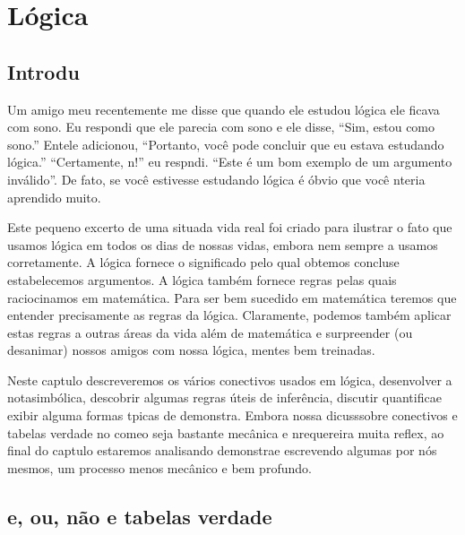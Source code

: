\chapter{L\'ogica}
\section{Introdu\cao}\label{introducao}

Um amigo meu recentemente me disse que quando ele estudou l\'ogica ele ficava com sono. Eu respondi que ele parecia com sono e ele disse, ``Sim, estou como sono.'' Ent\ao ele adicionou, ``Portanto, voc\^e pode concluir que eu estava estudando l\'ogica.'' ``Certamente, n\aoi!'' eu respndi. ``Este \'e um bom exemplo de um argumento inv\'alido''. De fato, se voc\^e estivesse estudando l\'ogica \'e \'obvio que voc\^e n\ao teria aprendido muito.

Este pequeno excerto de uma situa\cao da vida real  foi criado para ilustrar o fato que usamos l\'ogica em todos os dias de nossas vidas, embora nem sempre a usamos corretamente. A l\'ogica fornece o significado pelo qual obtemos conclus\oes e estabelecemos argumentos. A l\'ogica tamb\'em fornece regras pelas quais raciocinamos em matem\'atica. Para ser bem sucedido em matem\'atica teremos que entender precisamente as regras da l\'ogica. Claramente, podemos tamb\'em aplicar estas regras a outras \'areas da vida al\'em de matem\'atica e surpreender (ou desanimar) nossos amigos com nossa l\'ogica, mentes bem treinadas.

Neste cap\ih tulo descreveremos os v\'arios conectivos usados em l\'ogica, desenvolver a nota\cao simb\'olica, descobrir algumas regras \'uteis de infer\^encia, discutir quantifica\cao e exibir alguma formas t\ih picas de demonstra\caoi. Embora nossa dicuss\ao sobre conectivos e tabelas verdade no come\cc o seja bastante mec\^anica e n\ao requereira muita reflex\aoi, ao final do cap\ih tulo estaremos analisando demonstra\coes e escrevendo algumas por n\'os mesmos, um processo menos mec\^anico e bem profundo.

\section{e, ou, n\~ao e tabelas verdade}\label{eounao}

